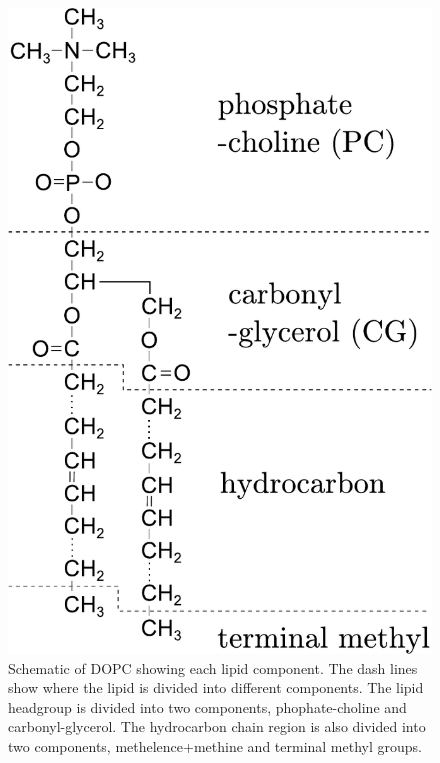 \begin{figure}[htbp]
  \centering
  \includegraphics[scale=0.7]{./figures/Tat/dopc_schematic.pdf}
  \caption{Schematic of DOPC showing each lipid component. The dash lines 
           show where the lipid is divided into different components. 
           The lipid headgroup
           is divided into two components, phophate-choline and carbonyl-glycerol. 
           The hydrocarbon chain region is also divided
           into two components, methelence+methine and terminal methyl groups.}
  \label{fig:dopc_schematic}
\end{figure}

